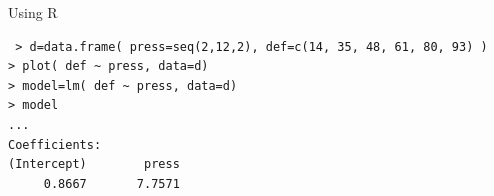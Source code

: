 \documentclass[smaller]{beamer}
\begin{document}
\begin{frame}[fragile]{Using R}
\begin{verbatim}
 > d=data.frame( press=seq(2,12,2), def=c(14, 35, 48, 61, 80, 93) )
> plot( def ~ press, data=d)
> model=lm( def ~ press, data=d)
> model
...                                                                                                                                                                                                                                                                               
Coefficients:                                                                                                                                                                                                                                                                  
(Intercept)        press                                                                                                                                                                                                                                                       
     0.8667       7.7571                                                                                                                                                                                                                                                       


\end{verbatim}
\end{frame}
\end{document}
